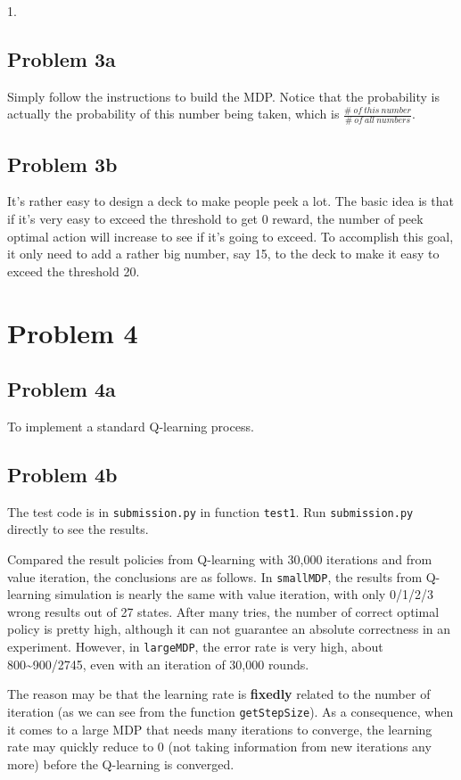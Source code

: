 \documentclass[paper=a4, fontsize=10pt]{scrartcl} %
\numberwithin{equation}{section} %
\numberwithin{figure}{section} %
\numberwithin{table}{section} %
\begin{document}
\begin{spacing}{1.}
\subsection{Problem 3a}
Simply follow the instructions to build the MDP. Notice that the probability is actually the probability of this number being taken, which is $\frac{\# \ of \ this \ number}{\# \ of \ all \ numbers}$.
\subsection{Problem 3b}
It's rather easy to design a deck to make people peek a lot. The basic idea is that if it's very easy to exceed the threshold to get 0 reward, the number of peek optimal action will increase to see if it's going to exceed. To accomplish this goal, it only need to add a rather big number, say 15, to the deck to make it easy to exceed the threshold 20.

\section{Problem 4}
\subsection{Problem 4a}
To implement a standard Q-learning process.

\subsection{Problem 4b}
The test code is in \texttt{submission.py} in function \texttt{test1}. Run \texttt{submission.py} directly to see the results.

Compared the result policies from Q-learning with 30,000 iterations and from value iteration, the conclusions are as follows. In \texttt{smallMDP}, the results from Q-learning simulation is nearly the same with value iteration, with only 0/1/2/3 wrong results out of 27 states. After many tries, the number of correct optimal policy is pretty high, although it can not guarantee an absolute correctness in an experiment. However, in \texttt{largeMDP}, the error rate is very high, about 800\~{}900/2745, even with an iteration of 30,000 rounds. 

The reason may be that the learning rate is \textbf{fixedly} related to the number of iteration (as we can see from the function \texttt{getStepSize}). As a consequence, when it comes to a large MDP that needs many iterations to converge, the learning rate may quickly reduce to 0 (not taking information from new iterations any more) before the Q-learning is converged.


\end{spacing}
\end{document}
